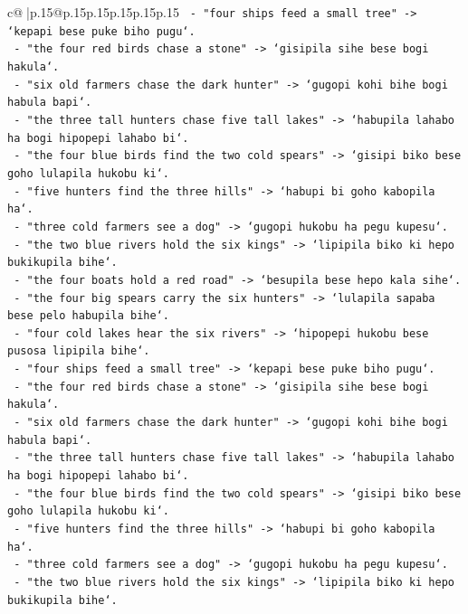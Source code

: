 \documentclass{article}
\begin{document}
{\begin{supertabular}{c@{$\;$}|p{.15\linewidth}@{}p{.15\linewidth}p{.15\linewidth}p{.15\linewidth}p{.15\linewidth}p{.15\linewidth}}
{{{\texttt{  {-} "four ships feed a small tree" {-}> `kepapi bese puke biho pugu`.} \\
\texttt{  {-} "the four red birds chase a stone" {-}> `gisipila sihe bese bogi hakula`.} \\
\texttt{  {-} "six old farmers chase the dark hunter" {-}> `gugopi kohi bihe bogi habula bapi`.} \\
\texttt{  {-} "the three tall hunters chase five tall lakes" {-}> `habupila lahabo ha bogi hipopepi lahabo bi`.} \\
\texttt{  {-} "the four blue birds find the two cold spears" {-}> `gisipi biko bese goho lulapila hukobu ki`.} \\
\texttt{  {-} "five hunters find the three hills" {-}> `habupi bi goho kabopila ha`.} \\
\texttt{  {-} "three cold farmers see a dog" {-}> `gugopi hukobu ha pegu kupesu`.} \\
\texttt{  {-} "the two blue rivers hold the six kings" {-}> `lipipila biko ki hepo bukikupila bihe`.} \\
\texttt{  {-} "the four boats hold a red road" {-}> `besupila bese hepo kala sihe`.} \\
\texttt{  {-} "the four big spears carry the six hunters" {-}> `lulapila sapaba bese pelo habupila bihe`.} \\
\texttt{  {-} "four cold lakes hear the six rivers" {-}> `hipopepi hukobu bese pusosa lipipila bihe`.} \\
\texttt{  {-} "four ships feed a small tree" {-}> `kepapi bese puke biho pugu`.} \\
\texttt{  {-} "the four red birds chase a stone" {-}> `gisipila sihe bese bogi hakula`.} \\
\texttt{  {-} "six old farmers chase the dark hunter" {-}> `gugopi kohi bihe bogi habula bapi`.} \\
\texttt{  {-} "the three tall hunters chase five tall lakes" {-}> `habupila lahabo ha bogi hipopepi lahabo bi`.} \\
\texttt{  {-} "the four blue birds find the two cold spears" {-}> `gisipi biko bese goho lulapila hukobu ki`.} \\
\texttt{  {-} "five hunters find the three hills" {-}> `habupi bi goho kabopila ha`.} \\
\texttt{  {-} "three cold farmers see a dog" {-}> `gugopi hukobu ha pegu kupesu`.} \\
\texttt{  {-} "the two blue rivers hold the six kings" {-}> `lipipila biko ki hepo bukikupila bihe`.} \\
}}}
\end{supertabular}}
\end{document}
